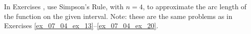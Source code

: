 {\noindent In Exercises}
{, use Simpson's Rule, with $n=4$, to approximate the arc length of the function on the given interval. Note: these are the same problems as in Exercises \ref{ex_07_04_ex_13}--\ref{ex_07_04_ex_20}.}
